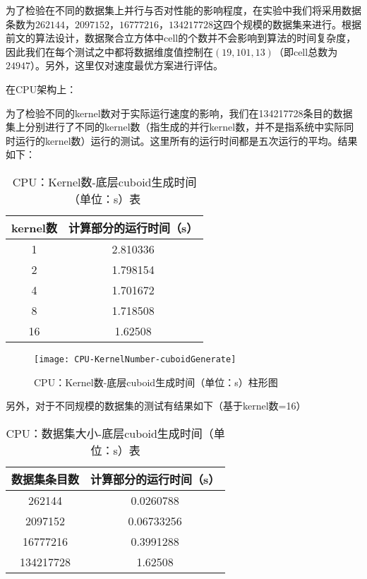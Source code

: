 为了检验在不同的数据集上并行与否对性能的影响程度，在实验中我们将采用数据条数为$262144$，$2097152$，$16777216$，$134217728$这四个规模的数据集来进行。根据前文的算法设计，数据聚合立方体中cell的个数并不会影响到算法的时间复杂度，因此我们在每个测试之中都将数据维度值控制在$(19, 101, 13)$（即cell总数为$24947$）。另外，这里仅对速度最优方案进行评估。

在CPU架构上：

为了检验不同的kernel数对于实际运行速度的影响，我们在134217728条目的数据集上分别进行了不同的kernel数（指生成的并行kernel数，并不是指系统中实际同时运行的kernel数）运行的测试。这里所有的运行时间都是五次运行的平均。结果如下：

\begin{table}[!htbp]
\centering
\caption{CPU：Kernel数-底层cuboid生成时间（单位：s）表} 
\label{tab:table4}
\begin{tabular}{|c|c|}
    \hline
    kernel数 & 计算部分的运行时间（s）\\
    \hline
    1 & 2.810336\\
    \hline
    2 & 1.798154\\
    \hline
    4 & 1.701672\\
    \hline
    8 & 1.718508\\
    \hline
    16 & 1.62508\\
    \hline
\end{tabular}
\end{table}

\begin{figure}[ht]
\centering
\texttt{[image: CPU-KernelNumber-cuboidGenerate]}
\caption{CPU：Kernel数-底层cuboid生成时间（单位：s）柱形图} 
\label{fig:figure1}
\end{figure}

另外，对于不同规模的数据集的测试有结果如下（基于kernel数=16）

\begin{table}[!htbp]
\centering
\caption{CPU：数据集大小-底层cuboid生成时间（单位：s）表} 
\label{tab:table5}
\begin{tabular}{|c|c|}
    \hline
    数据集条目数 & 计算部分的运行时间（s）\\
    \hline
    262144 & 0.0260788\\
    \hline
    2097152 & 0.06733256\\
    \hline
    16777216 & 0.3991288\\
    \hline
    134217728 & 1.62508\\
    \hline
\end{tabular}
\end{table}

